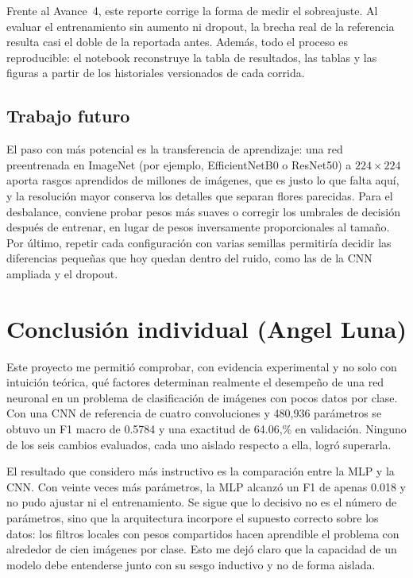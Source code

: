 Frente al Avance~4, este reporte corrige la forma de medir el sobreajuste. Al
evaluar el entrenamiento sin aumento ni dropout, la brecha real de la referencia
resulta casi el doble de la reportada antes. Además, todo el proceso es
reproducible: el notebook reconstruye la tabla de resultados, las tablas y las
figuras a partir de los historiales versionados de cada corrida.

\subsection{Trabajo futuro}

El paso con más potencial es la transferencia de aprendizaje: una red
preentrenada en ImageNet (por ejemplo, EfficientNetB0 o ResNet50) a
$224\times224$ aporta rasgos aprendidos de millones de imágenes, que es justo lo
que falta aquí, y la resolución mayor conserva los detalles que separan flores
parecidas. Para el desbalance, conviene probar pesos más suaves o corregir los
umbrales de decisión después de entrenar, en lugar de pesos inversamente
proporcionales al tamaño. Por último, repetir cada configuración con varias
semillas permitiría decidir las diferencias pequeñas que hoy quedan dentro del
ruido, como las de la CNN ampliada y el dropout.

\section{Conclusión individual (Angel Luna)}

Este proyecto me permitió comprobar, con evidencia experimental y no solo con intuición teórica, qué factores determinan realmente el desempeño de una red neuronal en un problema de clasificación de imágenes con pocos datos por clase. Con una CNN de referencia de cuatro convoluciones y 480,936 parámetros se obtuvo un F1 macro de 0.5784 y una exactitud de 64.06,\% en validación. Ninguno de los seis cambios evaluados, cada uno aislado respecto a ella, logró superarla.

El resultado que considero más instructivo es la comparación entre la MLP y la CNN. Con veinte veces más parámetros, la MLP alcanzó un F1 de apenas 0.018 y no pudo ajustar ni el entrenamiento. Se sigue que lo decisivo no es el número de parámetros, sino que la arquitectura incorpore el supuesto correcto sobre los datos: los filtros locales con pesos compartidos hacen aprendible el problema con alrededor de cien imágenes por clase. Esto me dejó claro que la capacidad de un modelo debe entenderse junto con su sesgo inductivo y no de forma aislada.

